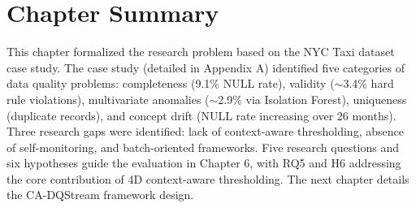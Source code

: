 \section{Chapter Summary}

This chapter formalized the research problem based on the NYC Taxi dataset case study. The case study (detailed in Appendix A) identified five categories of data quality problems: completeness (9.1\% NULL rate), validity ($\sim$3.4\% hard rule violations), multivariate anomalies ($\sim$2.9\% via Isolation Forest), uniqueness (duplicate records), and concept drift (NULL rate increasing over 26 months). Three research gaps were identified: lack of context-aware thresholding, absence of self-monitoring, and batch-oriented frameworks. Five research questions and six hypotheses guide the evaluation in Chapter 6, with RQ5 and H6 addressing the core contribution of 4D context-aware thresholding. The next chapter details the CA-DQStream framework design.
